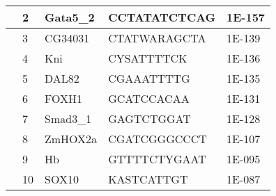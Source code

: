 \begin{center}
\begin{longtable}{|l|l|l|l|l|}
         & 2    & Gata5\_2      & CCTATATCTCAG       & 1E-157  \\ \hline
         & 3    & CG34031       & CTATWARAGCTA       & 1E-139  \\ \hline
         & 4    & Kni           & CYSATTTTCK         & 1E-136  \\ \hline
         & 5    & DAL82         & CGAAATTTTG         & 1E-135  \\ \hline
         & 6    & FOXH1         & GCATCCACAA         & 1E-131  \\ \hline
         & 7    & Smad3\_1      & GAGTCTGGAT         & 1E-128  \\ \hline
         & 8    & ZmHOX2a       & CGATCGGGCCCT       & 1E-107  \\ \hline
         & 9    & Hb            & GTTTTCTYGAAT       & 1E-095  \\ \hline
         & 10   & SOX10         & KASTCATTGT         & 1E-087  \\ \hline
\end{longtable}
\end{center}

